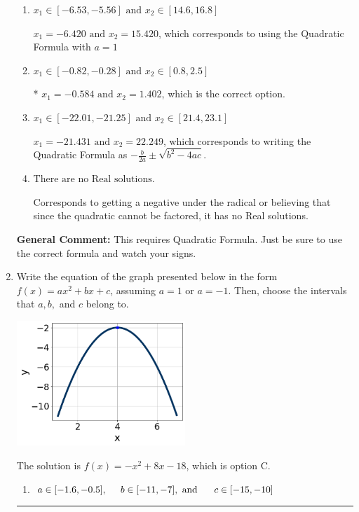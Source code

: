 \documentclass{extbook}[14pt]
\newcommand{\litem}[1]{\item #1

\rule{\textwidth}{0.4pt}}
\begin{document}
\begin{enumerate}
{\begin{enumerate}[label=\Alph*.]
 $x_1 = -1.402 \text{ and } x_2 = 0.584$, which corresponds to writing the Quadratic Formula as $\frac{b \pm \sqrt{b^2 - 4ac}}{2a}$
\item \( x_1 \in [-6.53, -5.56] \text{ and } x_2 \in [14.6, 16.8] \)

 $x_1 = -6.420 \text{ and } x_2 = 15.420$, which corresponds to using the Quadratic Formula with $a=1$
\item \( x_1 \in [-0.82, -0.28] \text{ and } x_2 \in [0.8, 2.5] \)

* $x_1 = -0.584 \text{ and } x_2 = 1.402$, which is the correct option.
\item \( x_1 \in [-22.01, -21.25] \text{ and } x_2 \in [21.4, 23.1] \)

 $x_1 = -21.431 \text{ and } x_2 = 22.249$, which corresponds to writing the Quadratic Formula as $-\frac{b}{2a} \pm \sqrt{b^2 - 4ac}$.
\item \( \text{There are no Real solutions.} \)

Corresponds to getting a negative under the radical or believing that since the quadratic cannot be factored, it has no Real solutions.
\end{enumerate}

\textbf{General Comment:} This requires Quadratic Formula. Just be sure to use the correct formula and watch your signs.
}
\litem{
Write the equation of the graph presented below in the form $f(x)=ax^2+bx+c$, assuming  $a=1$ or $a=-1$. Then, choose the intervals that $a, b,$ and $c$ belong to.

\begin{center}
    \includegraphics[width=0.5\textwidth]{../Figures/quadraticGraphToEquationB.png}
\end{center}


The solution is \( f(x) = -x^{2} +8 x -18 \), which is option C.\begin{enumerate}[label=\Alph*.]
\item \( a \in [-1.6, -0.5], \hspace*{5mm} b \in [-11, -7], \text{ and } \hspace*{5mm} c \in [-15, -10] \)


\end{enumerate}}
\end{enumerate}
\end{document}
